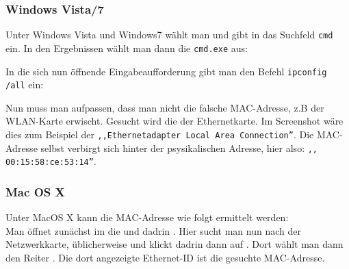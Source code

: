 \subsubsection*{Windows Vista/7}
 \begin{minipage}{0.9\linewidth}
Unter Windows Vista und Windows7 wählt man  und gibt in das Suchfeld 
 \texttt{cmd} ein. In den Ergebnissen wählt man dann die
 \texttt{cmd.exe} aus:


 In die sich nun öffnende Eingabeaufforderung gibt man den Befehl \texttt{ipconfig /all}
ein: %
\end{minipage}\newpage%
Nun muss man aufpassen, dass man nicht die falsche MAC-Adresse, z.B
der WLAN-Karte erwischt. Gesucht wird die der Ethernetkarte. Im
Screenshot wäre dies zum Beispiel der \texttt{,,Ethernetadapter Local Area Connection''}. 
Die MAC-Adresse selbst verbirgt sich hinter der psysikalischen
Adresse, hier %
also: \texttt{,, 00:15:58:ce:53:14''}.
\subsubsection*{Mac OS X}
Unter MacOS X kann die MAC-Adresse wie folgt ermittelt werden:\\
Man öffnet zunächst im  die  und dadrin
.  Hier sucht man nun nach der Netzwerkkarte,
üblicherweise   und klickt dadrin dann auf
. Dort wählt man dann den Reiter
. Die dort angezeigte Ethernet-ID ist die gesuchte
MAC-Adresse.

